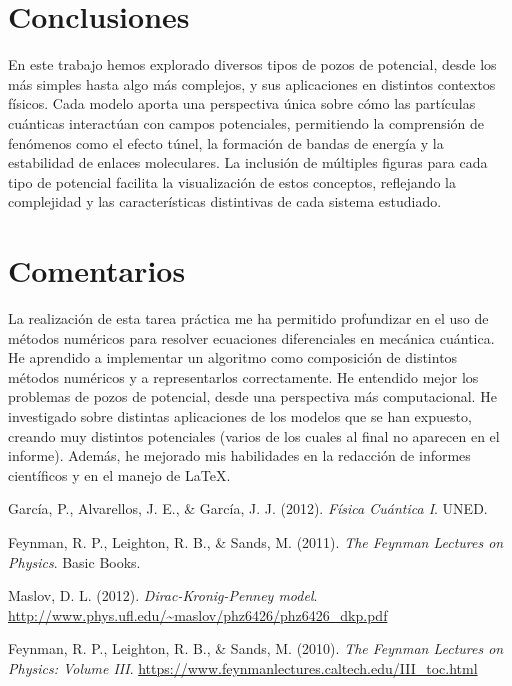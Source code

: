 \documentclass[a4paper,12pt]{article}
\begin{document}
\section{Conclusiones}
En este trabajo hemos explorado diversos tipos de pozos de potencial, desde los más simples hasta algo más complejos, y sus aplicaciones en distintos contextos físicos. Cada modelo aporta una perspectiva única sobre cómo las partículas cuánticas interactúan con campos potenciales, permitiendo la comprensión de fenómenos como el efecto túnel, la formación de bandas de energía y la estabilidad de enlaces moleculares. La inclusión de múltiples figuras para cada tipo de potencial facilita la visualización de estos conceptos, reflejando la complejidad y las características distintivas de cada sistema estudiado.

\section*{Comentarios}
La realización de esta tarea práctica me ha permitido profundizar en el uso de métodos numéricos para resolver ecuaciones diferenciales en mecánica cuántica. He aprendido a implementar un algoritmo como composición de distintos métodos numéricos y a representarlos correctamente. He entendido mejor los problemas de pozos de potencial, desde una perspectiva más computacional. He investigado sobre distintas aplicaciones de los modelos que se han expuesto, creando muy distintos potenciales (varios de los cuales al final no aparecen en el informe). Además, he mejorado mis habilidades en la redacción de informes científicos y en el manejo de \LaTeX.

\begin{thebibliography}{9}

García, P., Alvarellos, J. E., \& García, J. J. (2012). \textit{Física Cuántica I}. UNED.

Feynman, R. P., Leighton, R. B., \& Sands, M. (2011). \textit{The Feynman Lectures on Physics}. Basic Books.

Maslov, D. L. (2012). \textit{Dirac-Kronig-Penney model}. \url{http://www.phys.ufl.edu/~maslov/phz6426/phz6426_dkp.pdf}

Feynman, R. P., Leighton, R. B., \& Sands, M. (2010). \textit{The Feynman Lectures on Physics: Volume III}. \url{https://www.feynmanlectures.caltech.edu/III_toc.html}

\end{thebibliography}
\end{document}

